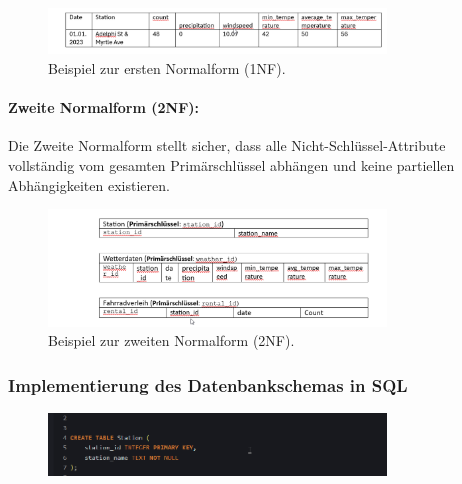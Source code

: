 \documentclass[a4paper,12pt]{article}
\begin{document}
\begin{figure}[h!]
\centering
\includegraphics[width=0.8\textwidth]{20241202_01150744.png}  %
\caption{Beispiel zur ersten Normalform (1NF).}
\label{fig:bild1}
\end{figure}

\paragraph{Zweite Normalform (2NF):}
Die Zweite Normalform stellt sicher, dass alle Nicht-Schlüssel-Attribute vollständig vom gesamten Primärschlüssel abhängen und keine partiellen Abhängigkeiten existieren.

\begin{figure}[h!]
\centering
\includegraphics[width=0.8\textwidth]{20241202_01151045.png}  %
\caption{Beispiel zur zweiten Normalform (2NF).}
\label{fig:bild2}
\end{figure}

\newpage



\subsubsection{Implementierung des Datenbankschemas in SQL}
\begin{figure}[h!]
\centering
\includegraphics[width=0.8\textwidth]{20241201_19513817.png}  %
\label{fig:bild1}
\end{figure}
\end{document}
